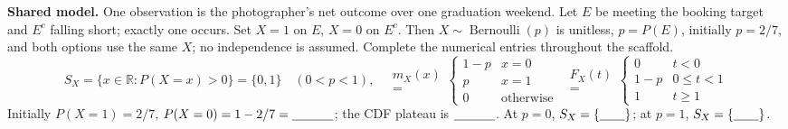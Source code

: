 \textbf{Shared model.} One observation is the photographer's net outcome over one graduation weekend.
Let $E$ be meeting the booking target and $E^c$ falling short; exactly one occurs.
Set $X=1$ on $E$, $X=0$ on $E^c$. Then $X\sim\operatorname{Bernoulli}(p)$ is unitless,
$p=P(E)$, initially $p=2/7$, and both options use the same $X$; no independence is assumed.
Complete the numerical entries throughout the scaffold.
\[
S_X=\{x\in\mathbb R:P(X=x)>0\}=\{0,1\}\quad(0<p<1),\quad
\begin{gathered}
m_X(x)\\
=
\end{gathered}
\begin{cases}1-p&x=0\\p&x=1\\0&\text{otherwise}\end{cases}
\enspace
\begin{gathered}
F_X(t)\\
=
\end{gathered}
\begin{cases}0&t<0\\1-p&0\leq t<1\\1&t\geq1\end{cases}
\]
Initially $P(X=1)=2/7$, $P(X=0)=1-2/7=\underline{\hspace{1.15cm}}$;
the CDF plateau is $\underline{\hspace{1.15cm}}$.
At $p=0$, $S_X=\{\underline{\hspace{.7cm}}\}$; at $p=1$, $S_X=\{\underline{\hspace{.7cm}}\}$.

